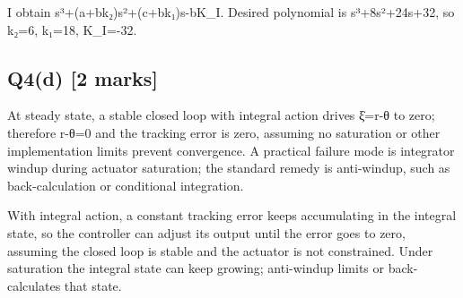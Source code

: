 \documentclass[11pt,a4paper]{article}
\begin{document}
I obtain s³+(a+bk₂)s²+(c+bk₁)s-bK\_I.
Desired polynomial is s³+8s²+24s+32, so k₂=6, k₁=18, K\_I=-32.

\subsection*{Q4(d) \hfill [2 marks]}

At steady state, a stable closed loop with integral action drives ξ̇=r-θ to zero; therefore r-θ=0 and the tracking error is zero, assuming no saturation or other implementation limits prevent convergence.
A practical failure mode is integrator windup during actuator saturation; the standard remedy is anti-windup, such as back-calculation or conditional integration.\par\smallskip With integral action, a constant tracking error keeps accumulating in the integral state, so the controller can adjust its output until the error goes to zero, assuming the closed loop is stable and the actuator is not constrained. Under saturation the integral state can keep growing; anti-windup limits or back-calculates that state.
\end{document}
